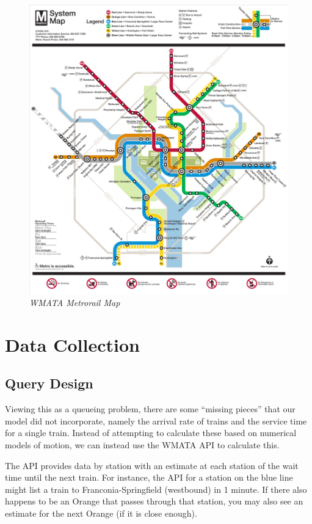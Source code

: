 \documentclass[a4paper,12pt]{article}
\begin{document}
\begin{figure}
\begin{center}
\includegraphics[width=5in]{../images/metro_map.pdf}
\caption{\small \sl WMATA Metrorail Map \label{fig:metromap} \cite{fioroni}}
\end{center}
\end{figure}

\section{Data Collection}

\subsection{Query Design}
Viewing this as a queueing problem, there are some ``missing pieces'' that our model did not incorporate, namely the
arrival rate of trains and the service time for a single train. Instead of attempting to calculate these based on 
numerical models of motion, we can instead use the WMATA API \cite{wmataapi} to calculate this.

The API provides data by station with an estimate at each station of the wait time until the next train. For instance,
the API for a station on the blue line might list a train to Franconia-Springfield (westbound) in 1 minute. If there
also happens to be an Orange that passes through that station, you may also see an estimate for the next Orange (if it
is close enough).
\end{document}
